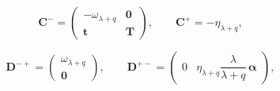 \documentclass[10pt,a4paper]{amsart}
\begin{document}
\begin{equation}\label{eq:params_ubv}
\bm{C}^- = \begin{pmatrix} -\omega_{\lambda+q} & \bm{0} \\ \bm{t} & \bm{T} \end{pmatrix}, \qquad \bm{C}^+ = -\eta_{\lambda+q},
\end{equation}

\begin{equation}\label{eq:params_ubv1}
\bm{D}^{-+} = \begin{pmatrix} \omega_{\lambda+q} \\ \bm{0} \end{pmatrix}, \qquad \bm{D}^{+-} = \begin{pmatrix} 0 & \eta_{\lambda+q}\dfrac{\lambda}{\lambda+q}\,\bm{\alpha} \end{pmatrix},
\end{equation}
\end{document}
